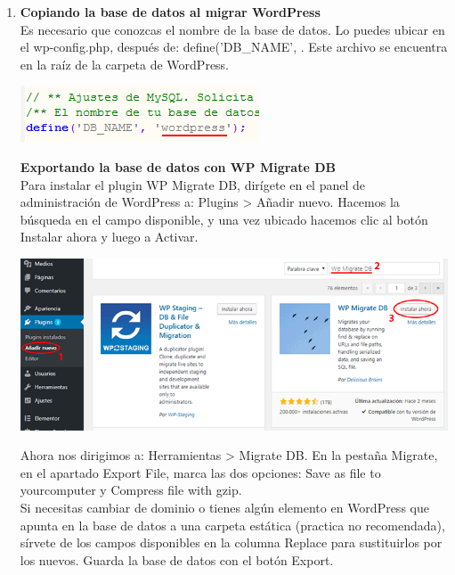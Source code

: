		\begin{enumerate}
			\item \textbf{Copiando la base de datos al migrar WordPress}\\
			
			Es necesario que conozcas el nombre de la base de datos. Lo puedes ubicar en el wp-config.php, después de: define('DB\_NAME', . Este archivo se encuentra en la raíz de la carpeta de WordPress.
			
			\begin{center}
				\includegraphics[scale=0.5]{image/migra1.png}
			\end{center}
		
		\textbf{Exportando la base de datos con WP Migrate DB}\\
		
		Para instalar el plugin WP Migrate DB, dirígete en el panel de administración de WordPress a: Plugins > Añadir nuevo. Hacemos la búsqueda en el campo disponible, y una vez ubicado hacemos clic al botón Instalar ahora y luego a Activar.
		
		\begin{center}
			\includegraphics[scale=0.4]{image/migra2.png}
		\end{center}
		\newpage
		
		Ahora nos dirigimos a: Herramientas > Migrate DB. En la pestaña Migrate, en el apartado Export File, marca las dos opciones: Save as file to yourcomputer y Compress file with gzip.\\
		
		Si necesitas cambiar de dominio o tienes algún elemento en WordPress que apunta en la base de datos a una carpeta estática (practica no recomendada), sírvete de los campos disponibles en la columna Replace para sustituirlos por los nuevos. Guarda la base de datos con el botón Export.\\
		

\end{enumerate}
